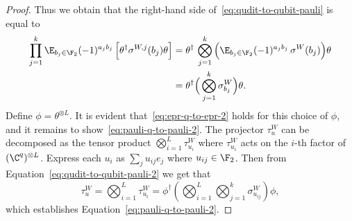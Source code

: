 \begin{proof}
  Thus we obtain that the right-hand side of~\eqref{eq:qudit-to-qubit-pauli} is
  equal to
  \begin{align}
		\prod_{j=1}^k \E_{b_j \in \F_2} (-1)^{a_j b_j} \,
    \Big [ \theta^\dagger \sigma^{W,j}(b_j) \theta \Big ]
    & = \theta^\dagger \, \bigotimes_{j=1}^k
      \Big ( \E_{b_j \in \F_2} (-1)^{a_j b_j} \, \sigma^{W}(b_j) \Big) \theta \\
		& = \theta^\dagger \Big (\bigotimes_{j=1}^k \sigma^W_{b_j} \Big) \theta.
		\label{eq:qudit-to-qubit-pauli-2}
  \end{align}
  Define $\phi = \theta^{\otimes L}$. It is evident
  that~\eqref{eq:epr-q-to-epr-2} holds for this choice of $\phi$, and
  it remains to show~\eqref{eq:pauli-q-to-pauli-2}. The projector $\tau^W_u$ can be
  decomposed as the tensor product $\bigotimes_{i=1}^L \tau^{W}_{u_i}$
  where $\tau^{W}_{u_i}$ acts on the $i$-th factor of $(\C^q)^{\otimes L}$.
  Express each $u_i$ as $\sum_j u_{ij} e_j$ where $u_{ij} \in \F_2$. Then from
  Equation~\eqref{eq:qudit-to-qubit-pauli-2} we get that
  \begin{equation}
  	\tau^W_u = \bigotimes_{i=1}^L \tau^W_{u_i}
    = \phi^\dagger \left( \bigotimes_{i=1}^L
      \bigotimes_{j=1}^k \sigma^W_{u_{ij}} \right) \phi,
  \end{equation}
  which establishes Equation~\eqref{eq:pauli-q-to-pauli-2}. 
\end{proof}


 
